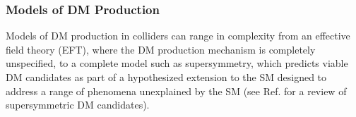\subsubsection{Models of DM Production}

Models of DM production in colliders can range in complexity from an effective field theory (EFT), where the DM production mechanism is completely unspecified, to a complete model such as supersymmetry, which predicts viable DM candidates as part of a hypothesized extension to the SM designed to address a range of phenomena unexplained by the SM (see Ref. \cite{susy_dm} for a review of supersymmetric DM candidates). 


